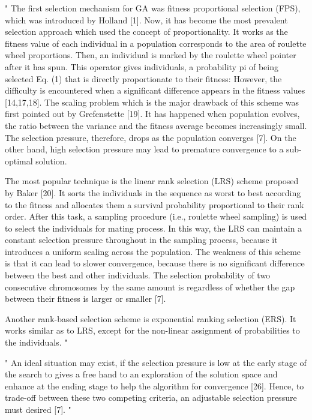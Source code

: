 "
The first selection mechanism for GA was fitness proportional selection (FPS), which was introduced by Holland [1]. Now, it has become the most prevalent selection approach which used the concept of proportionality. It works as the fitness value of each individual in a population corresponds to the area of roulette wheel proportions. Then, an individual is marked by the roulette wheel pointer after it has spun. This operator gives individuals, a probability pi of being selected Eq. (1) that is directly proportionate to their fitness:
However, the difficulty is encountered when a significant difference appears in the fitness values [14,17,18]. The scaling problem which is the major drawback of this scheme was first pointed out by Grefenstette [19]. It has happened when population evolves, the ratio between the variance and the fitness average becomes increasingly small. The selection pressure, therefore, drops as the population converges [7]. On the other hand, high selection pressure may lead to premature convergence to a sub-optimal solution.


The most popular technique is the linear rank selection (LRS) scheme proposed by Baker [20]. It sorts the individuals in the sequence as worst to best according to the fitness and allocates them a survival probability proportional to their rank order. After this task, a sampling procedure (i.e., roulette wheel sampling) is used to select the individuals for mating process. In this way, the LRS can maintain a constant selection pressure throughout in the sampling process, because it introduces a uniform scaling across the population.
The weakness of this scheme is that it can lead to slower convergence, because there is no significant difference between the best and other individuals. The selection probability of two consecutive chromosomes by the same amount is regardless of whether the gap between their fitness is larger or smaller [7].


Another rank-based selection scheme is exponential ranking selection (ERS). It works similar as to LRS, except for the non-linear assignment of probabilities to the individuals.
"\cite{hussain_trade-off_2020}


"
An ideal situation may exist, if the selection pressure is low at the early stage of the search to gives a free hand to an exploration of the solution space and enhance at the ending stage to help the algorithm for convergence [26]. Hence, to trade-off between these two competing criteria, an adjustable selection pressure must desired [7].
"\cite{hussain_trade-off_2020}

